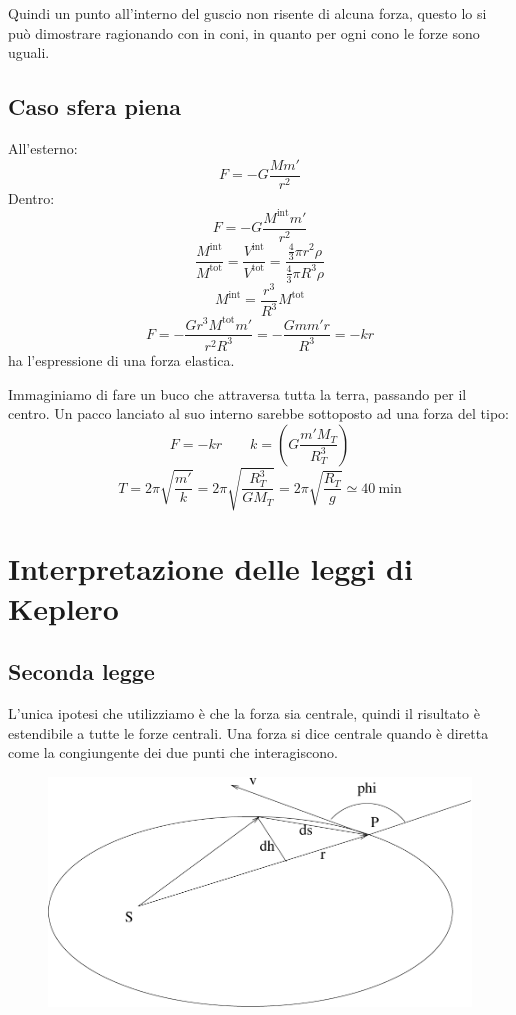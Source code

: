 Quindi un punto all'interno del guscio non risente di alcuna
forza, questo lo si può dimostrare ragionando con in coni, in
quanto per ogni cono le forze sono uguali.
\subsection{Caso sfera piena}
All'esterno:
\[F=-G\frac{Mm'}{r^2}\]
Dentro:
\[F=-G\frac{M^{\text{int}}m'}{r^2}\]
\[\frac{M^{\text{int}}}{M^{\text{tot}}}=\frac{V^{\text{int}}}{V^{\text{tot}}}=\frac{\frac{4}{3}\pi r^2\rho}{\frac{4}{3}\pi R^3\rho}\]
\[M^{\text{int}}=\frac{r^3}{R^3}M^{\text{tot}}\]
\[F=-\frac{Gr^3M^{\text{tot}}m'}{r^2R^3}=-\frac{Gmm'r}{R^3}=-kr\]
ha l'espressione di una forza elastica.

\begin{Es}
Immaginiamo di fare un buco che attraversa tutta la terra, passando per il centro. Un pacco lanciato al suo interno sarebbe sottoposto ad una forza del tipo:
\[F=-kr\qquad k=\left(G\frac{m'M_T}{R_T^3}\right)\]
\[T=2\pi\sqrt{\frac{m'}{k}}=2\pi\sqrt{\frac{R_T^3}{GM_T}}=2\pi\sqrt{\frac{R_T}{g}}\simeq \SI{40}{\minute} \]
\end{Es}
\section{Interpretazione delle leggi di Keplero}
\subsection{Seconda legge}

L'unica ipotesi che utilizziamo è che la forza sia centrale,
quindi il risultato è estendibile a tutte le forze centrali. Una
forza si dice centrale quando è diretta come la congiungente dei
due punti che interagiscono.

\begin{figure}[htbp]
   \centering
   \includegraphics[scale=0.45]{immagini/fisica1/keplero}
\end{figure}



